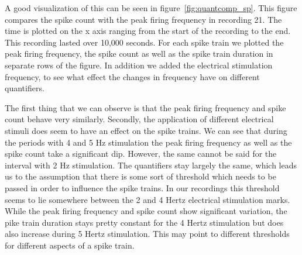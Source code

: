 A good visualization of this can be seen in figure~\ref{fig:quantcomp_sp}. This figure compares the spike count with the peak firing frequency in recording 21. The time is plotted on the x axis ranging from the start of the recording to the end. This recording lasted over 10,000 seconds. For each spike train we plotted the peak firing frequency, the spike count as well as the spike train duration in separate rows of the figure. In addition we added the electrical stimulation frequency, to see what effect the changes in frequency have on different quantifiers. 

The first thing that we can observe is that the peak firing frequency and spike count behave very similarly. Secondly, the application of different electrical stimuli does seem to have an effect on the spike trains. We can see that during the periods with 4 and 5 Hz stimulation the peak firing frequency as well as the spike count take a significant dip. However, the same cannot be said for the interval with 2 Hz stimulation. The quantifiers stay largely the same, which leads us to the assumption that there is some sort of threshold which needs to be passed in order to influence the spike trains. In our recordings this threshold seems to lie somewhere between the 2 and 4 Hertz electrical stimulation marks.
While the peak firing frequency and spike count show significant variation, the pike train duration stays pretty constant for the 4 Hertz stimulation but does also increase during 5 Hertz stimulation. This may point to different thresholds for different aspects of a spike train.

